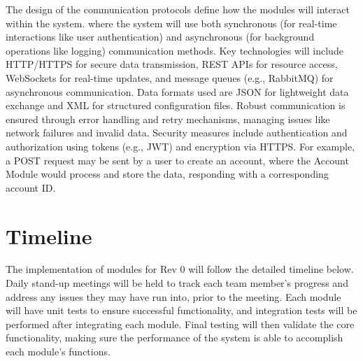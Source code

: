 \documentclass[12pt, titlepage]{article}
\begin{document}
The design of the communication protocols define how the modules will interact within the system.
where the system will use both synchronous (for real-time interactions like user authentication)
and asynchronous (for background operations like logging) communication methods.
Key technologies will include HTTP/HTTPS for secure data transmission, REST APIs for
resource access, WebSockets for real-time updates, and message queues (e.g., RabbitMQ)
for asynchronous communication. Data formats used are JSON for lightweight data exchange
and XML for structured configuration files. Robust communication is ensured through error
handling and retry mechanisms, managing issues like network failures and invalid data.
Security measures include authentication and authorization using tokens (e.g., JWT) and
encryption via HTTPS. For example, a POST request may be sent by a user to create an account,
where the Account Module would process and store the data, responding with a corresponding account ID.

\section{Timeline}

The implementation of modules for Rev 0 will follow the detailed timeline below.
Daily stand-up meetings will be held to track each team member's progress and address
any issues they may have run into, prior to the meeting. Each module will have unit
tests to ensure successful functionality, and integration tests will be performed
after integrating each module. Final testing will then validate the core functionality,
making sure the performance of the system is able to accomplish each module's functions.
\end{document}
